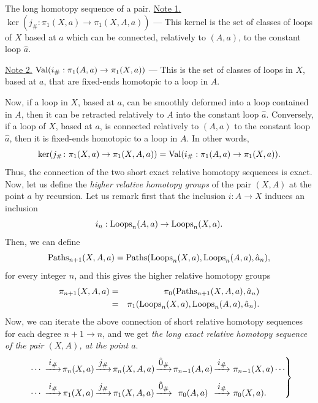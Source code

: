 \begin{Article}{The long homotopy sequence of a pair.}{}
  \uline{Note 1.} $\ker(j_\# : \pi_1(X,a) \to \pi_1(X,A,a))$ --- This kernel is the set of classes of loops of $X$ based at $a$ which can be connected,
  relatively to $(A,a)$,
  to the constant loop $\hat a$.

  \uline{Note 2.} $\operatorname{Val}(i_\# : \pi_1(A,a) \to \pi_1(X,a))$ --- This is the set of classes of loops in $X$,
  based at $a$,
  that are fixed-ends homotopic to a loop in $A$.

  Now, if a loop in $X$,
  based at $a$,
  can be smoothly deformed into a loop contained in $A$,
  then it can be retracted relatively to $A$ into the constant loop $\hat a$.
  Conversely,
  if a loop of $X$,
  based at $a$,
  is connected relatively to $(A,a)$ to the constant loop $\hat a$,
  then it is fixed-ends homotopic to a loop in $A$.
  In other words,
  $$%
  \ker(j_\# \colon \pi_1(X,a) \to \pi_1(X,A,a)) = \Val(i_\# : \pi_1(A,a) \to \pi_1(X,a)).
  $$%
  Thus, the connection of the two short exact relative homotopy sequences is exact.
  Now, let us define the \emph{higher relative homotopy groups} of the pair $(X,A)$ at the point $a$ by recursion.
  Let us remark first that the inclusion $i \colon A \to X$ induces an inclusion
  $$%
  i_n : \Loops_n(A,a) \to \Loops_n(X,a).
  $$%
  Then,
  we can define
  $$%
  \Paths_{n+1}(X,A,a) = \Paths(\Loops_n(X,a),\Loops_n(A,a), \hat a_n),
  $$%
  for every integer $n$,
  and this gives the higher relative homotopy groups
  \begin{eqnarray*}
    \pi_{n+1}(X,A,a) &  = & \pi_0(\operatorname{Paths}_{n+1}(X,A,a),\hat a_n) \\
    & = & \pi_1(\operatorname{Loops}_n(X,a),\operatorname{Loops}_n(A,a), \hat a_n).
  \end{eqnarray*}
  Now,
  we can iterate the above connection of short relative homotopy sequences for each degree $n+1 \to n$,
  and we get \emph{the long exact relative homotopy sequence of the pair $(X,A)$, at the point $a$}.
  \begin{equation*}
    \left.
    \begin{array}{r@{\hspace{-2pt}}c@{\hspace{-2pt}}c@{\hspace{-2pt}}c@{\hspace{-2pt}}c@{\hspace{-2pt}}c@{\hspace{-2pt}}c@{\hspace{0pt}}l@{\hspace{-2pt}}l}
      \cdots \rfl{i_\#} &  \pi_n(X,a) & \rfl{j_\#} & \pi_n(X,A,a) & \rfl{\0_\#} & \pi_{n-1}(A,a) & \rfl{i_\#} & \pi_{n-1}(X,a) \cdots\,
      \\
      \vspace{-5pt}
      \\
      \cdots \rfl{i_\#} &  \pi_1(X,a) & \rfl{j_\#} & \pi_1(X,A,a) & \rfl{\0_\#} & \pi_0(A,a)     & \rfl{i_\#} & \pi_0(X,a).
    \end{array}
    \right\}
  \end{equation*}
\end{Article} %

